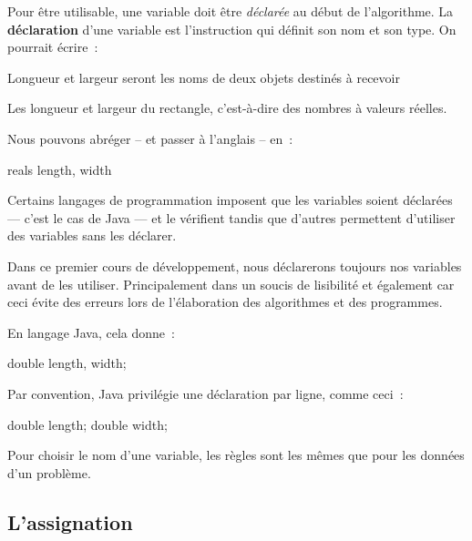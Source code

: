			Pour être utilisable, une variable doit être \emph{déclarée} au
			début de l’algorithme. La \textbf{déclaration}
			d’une variable est l’instruction qui définit son nom et son type.
			On pourrait écrire~:

			\begin{langagenaturel}
				Longueur et largeur seront les noms de deux 
				objets destinés à recevoir
				
				Les longueur et largeur du rectangle, 
				c’est-à-dire des nombres à valeurs réelles.
				
			\end{langagenaturel}
	
			Nous pouvons abréger -- et passer à l'anglais -- en~:

			\begin{langagenaturel}
				reals length, width
			\end{langagenaturel}
	
			Certains langages de programmation imposent que les variables soient 
			déclarées — c'est le cas de Java — et le vérifient tandis que d'autres 
			permettent d'utiliser des variables sans les déclarer. 
			
			Dans ce premier cours de développement, nous déclarerons toujours nos
			variables avant de les utiliser. Principalement dans un soucis de
			lisibilité et également car ceci évite des erreurs lors de
			l'élaboration des algorithmes et des programmes.  

			En langage Java, cela donne~:

			\begin{java}
double length, width;
			\end{java}

			Par convention, Java privilégie une déclaration par ligne, comme 
			ceci~:
			
			\begin{java}
double length;
double width;
			\end{java}
			
			Pour choisir le nom d’une variable, les règles sont les mêmes que
			pour les données d’un problème.


			\pagebreak
		\subsection{L’assignation}
	
